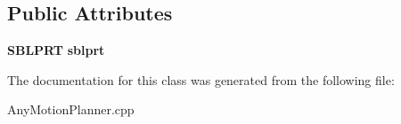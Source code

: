 \subsection*{Public Attributes}
\begin{DoxyCompactItemize}
\item 
{\bf S\+B\+L\+P\+RT} {\bfseries sblprt}\label{classSBLPRTInterface_a736a22815895b17a90e2d1adf1fa0b0a}

\end{DoxyCompactItemize}


The documentation for this class was generated from the following file\+:\begin{DoxyCompactItemize}
\item 
Any\+Motion\+Planner.\+cpp\end{DoxyCompactItemize}
